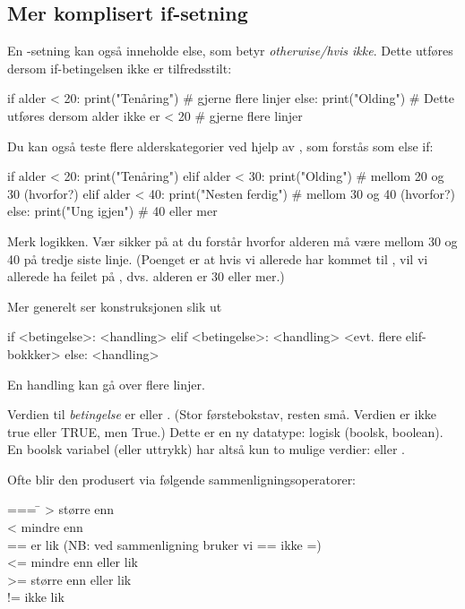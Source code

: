 \subsection{Mer komplisert if-setning}
En -setning kan også inneholde else, som betyr {\em otherwise/hvis ikke}. Dette utføres dersom if-betingelsen ikke er tilfredsstilt:
\begin{usncodebox}
if alder < 20: 
   print("Tenåring")
   # gjerne flere linjer
else: 
   print("Olding")     # Dette utføres dersom alder ikke er < 20
   # gjerne flere linjer
\end{usncodebox}

Du kan også teste flere alderskategorier ved hjelp av , som forstås som else if:
\begin{usncodebox}
if alder < 20: 
   print("Tenåring")
elif alder < 30:           
   print("Olding")         # mellom 20 og 30 (hvorfor?) 
elif alder < 40: 
   print("Nesten ferdig")  # mellom 30 og 40 (hvorfor?)
else: 
   print("Ung igjen")  # 40 eller mer 
\end{usncodebox}

Merk logikken. Vær sikker på at du forstår hvorfor alderen må være mellom 30 og 40 på tredje siste linje. (Poenget er at hvis vi allerede har kommet til , vil vi allerede ha feilet på , dvs. alderen er 30 eller mer.) 

Mer generelt ser konstruksjonen slik ut

\begin{usncodebox}
if <betingelse>: 
   <handling>
elif <betingelse>: 
   <handling>
<evt. flere elif-bokkker>
else: 
   <handling>
\end{usncodebox}

En handling kan gå over flere linjer. 

Verdien til {\em betingelse} er  eller . (Stor førstebokstav, resten små. Verdien er ikke true eller TRUE, men True.) Dette er en ny datatype: logisk (boolsk, boolean). En boolsk variabel (eller uttrykk) har altså kun to mulige verdier:  eller . 

Ofte blir den produsert via følgende sammenligningsoperatorer:
\begin{tabbing}
=== \=\kill
>  \> større enn\\
<  \> mindre enn\\
== \> er lik  (NB: ved sammenligning bruker vi == ikke =)\\
<= \> mindre enn eller lik\\
>= \> større enn eller lik\\
!= \> ikke lik
\end{tabbing}

